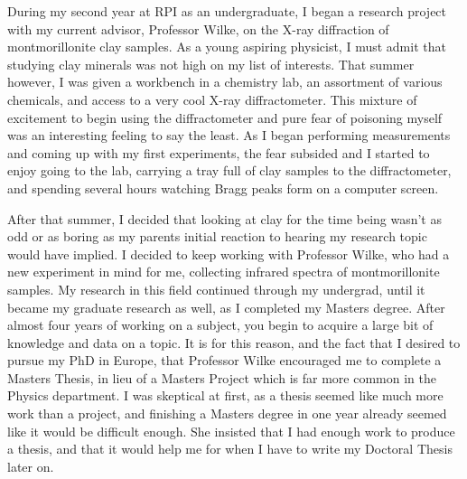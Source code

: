  
 
During my second year at RPI as an undergraduate, I began a research project with my current advisor, Professor Wilke, on the X-ray diffraction of montmorillonite clay samples. As a young aspiring physicist, I must admit that studying clay minerals was not high on my list of interests. That summer however, I was given a workbench in a chemistry lab, an assortment of various chemicals, and access to a very cool X-ray diffractometer. This mixture of excitement to begin using the diffractometer and pure fear of poisoning myself was an interesting feeling to say the least. As I began performing measurements and coming up with my first experiments, the fear subsided and I started to enjoy going to the lab, carrying a tray full of clay samples to the diffractometer, and spending several hours watching Bragg peaks form on a computer screen.

After that summer, I decided that looking at clay for the time being wasn't as odd or as boring as my parents initial reaction to hearing my research topic would have implied. I decided to keep working with Professor Wilke, who had a new experiment in mind for me, collecting infrared spectra of montmorillonite samples. My research in this field continued through my undergrad, until it became my graduate research as well, as I completed my Masters degree. After almost four years of working on a subject, you begin to acquire a large bit of knowledge and data on a topic. It is for this reason, and the fact that I desired to pursue my PhD in Europe, that Professor Wilke encouraged me to complete a Masters Thesis, in lieu of a Masters Project which is far more common in the Physics department. I was skeptical at first, as a thesis seemed like much more work than a project, and finishing a Masters degree in one year already seemed like it would be difficult enough. She insisted that I had enough work to produce a thesis, and that it would help me for when I have to write my Doctoral Thesis later on.

